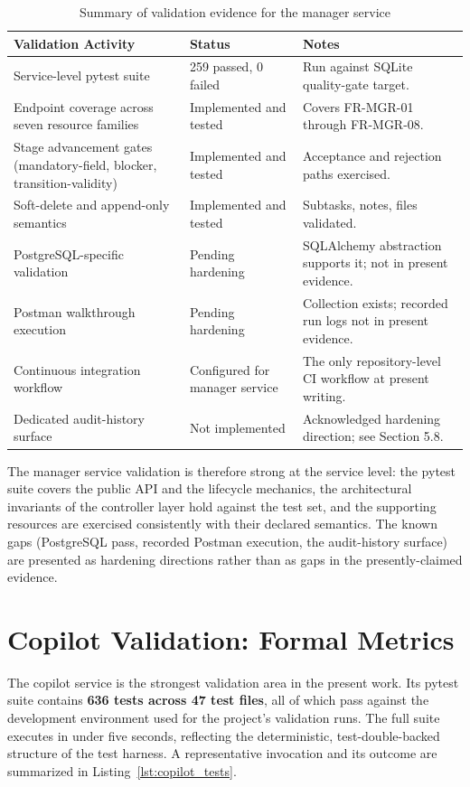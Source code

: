 \begin{table}[H]
\centering
\renewcommand{\arraystretch}{1.4}
\begin{tabular}{|p{4.5cm}|p{4cm}|p{5cm}|}
\hline
\rowcolor{lightgray}
\textbf{Validation Activity} & \textbf{Status} & \textbf{Notes} \\ \hline
Service-level pytest suite & 259 passed, 0 failed & Run against SQLite quality-gate target. \\ \hline
Endpoint coverage across seven resource families & Implemented and tested & Covers FR-MGR-01 through FR-MGR-08. \\ \hline
Stage advancement gates (mandatory-field, blocker, transition-validity) & Implemented and tested & Acceptance and rejection paths exercised. \\ \hline
Soft-delete and append-only semantics & Implemented and tested & Subtasks, notes, files validated. \\ \hline
PostgreSQL-specific validation & Pending hardening & SQLAlchemy abstraction supports it; not in present evidence. \\ \hline
Postman walkthrough execution & Pending hardening & Collection exists; recorded run logs not in present evidence. \\ \hline
Continuous integration workflow & Configured for manager service & The only repository-level CI workflow at present writing. \\ \hline
Dedicated audit-history surface & Not implemented & Acknowledged hardening direction; see Section 5.8. \\ \hline
\end{tabular}
\caption{Summary of validation evidence for the manager service}
\label{tab:manager_validation}
\end{table}

The manager service validation is therefore strong at the service level: the pytest suite covers the public API and the lifecycle mechanics, the architectural invariants of the controller layer hold against the test set, and the supporting resources are exercised consistently with their declared semantics. The known gaps (PostgreSQL pass, recorded Postman execution, the audit-history surface) are presented as hardening directions rather than as gaps in the presently-claimed evidence.

\section{Copilot Validation: Formal Metrics}
The copilot service is the strongest validation area in the present work. Its pytest suite contains \textbf{636 tests across 47 test files}, all of which pass against the development environment used for the project's validation runs. The full suite executes in under five seconds, reflecting the deterministic, test-double-backed structure of the test harness. A representative invocation and its outcome are summarized in Listing~\ref{lst:copilot_tests}.

